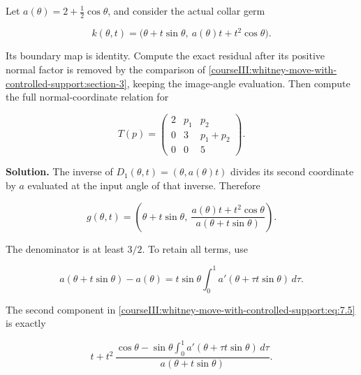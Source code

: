 \label{courseIII:whitney-support:7.2}

Let \(a(\theta)=2+\tfrac12\cos\theta\), and consider the actual collar germ

\begin{equation}
k(\theta,t)=
\bigl(\theta+t\sin\theta,\ a(\theta)t+t^2\cos\theta\bigr).
\label{courseIII:whitney-move-with-controlled-support:eq:7.3}
\end{equation}

Its boundary map is identity. Compute the exact residual after its positive normal factor is removed by the comparison of \cref{courseIII:whitney-move-with-controlled-support:section-3}, keeping the image-angle evaluation. Then compute the full normal-coordinate relation for

\begin{equation}
T(p)=
\begin{pmatrix}
2&p_1&p_2\\
0&3&p_1+p_2\\
0&0&5
\end{pmatrix}.
\label{courseIII:whitney-move-with-controlled-support:eq:7.4}
\end{equation}

\textbf{Solution.} The inverse of \(D_1(\theta,t)=(\theta,a(\theta)t)\) divides its second coordinate by \(a\) evaluated at the input angle of that inverse. Therefore

\begin{equation}
g(\theta,t)=
\left(\theta+t\sin\theta,\
\frac{a(\theta)t+t^2\cos\theta}
     {a(\theta+t\sin\theta)}\right).
\label{courseIII:whitney-move-with-controlled-support:eq:7.5}
\end{equation}

The denominator is at least \(3/2\). To retain all terms, use

\begin{equation}
a(\theta+t\sin\theta)-a(\theta)
=t\sin\theta\int_0^1a'(\theta+\tau t\sin\theta)\,d\tau.
\label{courseIII:whitney-move-with-controlled-support:eq:7.6}
\end{equation}

The second component in \eqref{courseIII:whitney-move-with-controlled-support:eq:7.5} is exactly

\begin{equation}
t+t^2\,
\frac{\cos\theta-\sin\theta\int_0^1
a'(\theta+\tau t\sin\theta)\,d\tau}
{a(\theta+t\sin\theta)}.
\label{courseIII:whitney-move-with-controlled-support:eq:7.7}
\end{equation}

